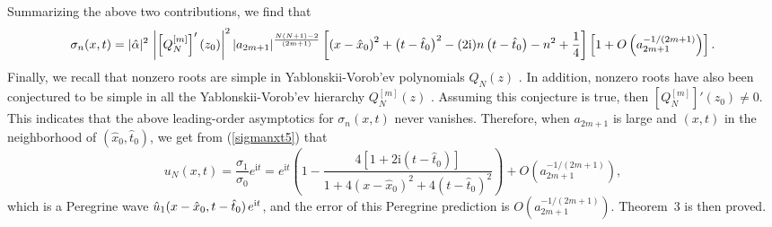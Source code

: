 \documentclass[amsmath,amssymb]{revtex4}
\def\[{\begin{equation}}
\def\]{\end{equation}}
\begin{document}
Summarizing the above two contributions, we find that
\[ \label{sigmanxt5}
\sigma_{n}(x,t) = |\hat{\alpha}|^2 \hspace{0.06cm} \left|\left[Q_{N}^{[m]}\right]'(z_0)\right|^2 |a_{2m+1}|^{\frac{N(N+1)-2}{(2m+1)}}
\left[ \left(x-\hat{x}_{0}\right)^2+\left(t-\hat{t}_{0}\right)^2 - (2 \textrm{i}) n \left(t-\hat{t}_{0}\right)-n^2+\frac{1}{4} \right]\left[1+O\left(a_{2m+1}^{-1/(2m+1)}\right)\right].
\]
Finally, we recall that nonzero roots are simple in Yablonskii-Vorob'ev polynomials $Q_{N}(z)$ \cite{Fukutani}. In addition, nonzero roots have also been conjectured to be simple in all the Yablonskii-Vorob'ev hierarchy $Q_{N}^{[m]}(z)$ \cite{Clarkson2003-II}. Assuming this conjecture is true, then
$\left[Q_{N}^{[m]}\right]'(z_0)\ne 0$. This indicates that the above leading-order asymptotics for $\sigma_{n}(x,t)$ never vanishes. Therefore, when $a_{2m+1}$ is large and $(x, t)$ in the neighborhood of $\left(\hat{x}_{0}, \hat{t}_{0}\right)$, we get from (\ref{sigmanxt5}) that
\[
u_N(x,t) = \frac{\sigma_{1}}{\sigma_{0}}e^{\textrm{i}t} =e^{\textrm{i}t}
\left(1- \frac{4[1+2\textrm{i}(t-\hat{t}_{0})]}{1+4(x-\hat{x}_{0})^2+4(t-\hat{t}_{0})^2}\right) + O\left(a_{2m+1}^{-1/(2m+1)}\right),
\]
which is a Peregrine wave $\hat{u}_1(x-\hat{x}_{0}, t-\hat{t}_{0}) \hspace{0.05cm} e^{\textrm{i}t}$, and the error of this Peregrine prediction is $O\left(a_{2m+1}^{-1/(2m+1)}\right)$. Theorem~3 is then proved.
\end{document}
